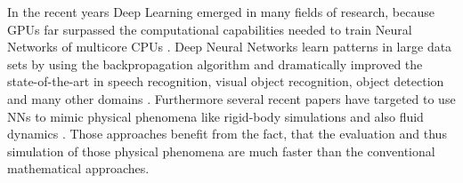 \par In the recent years Deep Learning emerged in many fields of research, because GPUs far surpassed the computational capabilities needed to train Neural Networks of multicore CPUs \parencite{raina2009large}. Deep Neural Networks learn patterns in large data sets by using the backpropagation algorithm and dramatically improved the state-of-the-art in speech recognition, visual object recognition, object detection and many other domains \parencite{lecun2015deep}. Furthermore several recent papers have targeted to use NNs to mimic physical phenomena like rigid-body simulations \parencite{chang2016compositional} and also fluid dynamics \parencite{tompson2017accelerating}  \parencite{chu2017data} \parencite{schenck2018spnets}. Those approaches benefit from the fact, that the evaluation and thus simulation of those physical phenomena are much faster than the conventional mathematical approaches.